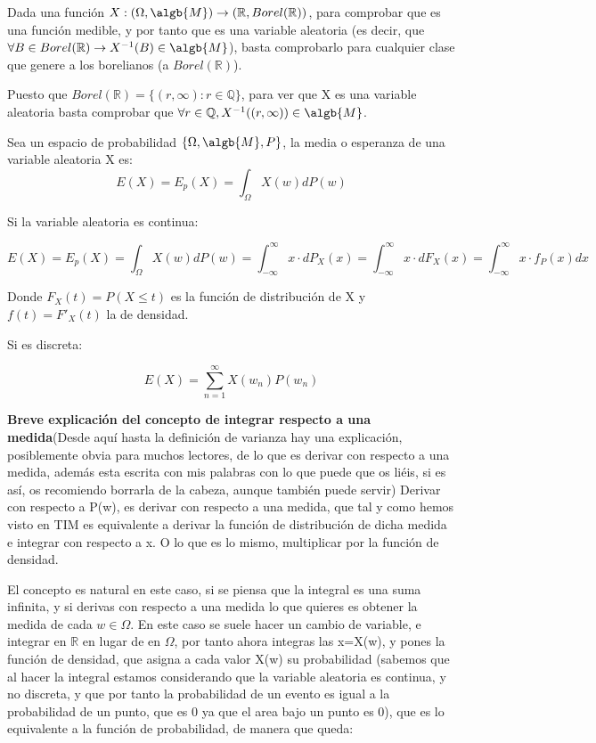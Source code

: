 \documentclass{apuntes}
\begin{document}
\begin{example}
\obs Dada una función $X:(\Omega, \algb{M}) \rightarrow (\mathbb{R}, Borel(\mathbb{R}))$, para comprobar que es una función medible, y por tanto que es una variable aleatoria (es decir, que $\forall B \in Borel(\mathbb{R}) \rightarrow X^{-1}(B) \in \algb{M}$), basta comprobarlo para cualquier clase que genere a los borelianos (a $Borel(\mathbb{R})$).

Puesto que $Borel(\mathbb{R})=\{(r,\infty): r\in \mathbb{Q}\}$, para ver que X es una variable aleatoria basta comprobar que $\forall r \in \mathbb{Q}, X^{-1}((r, \infty)) \in \algb{M}$.

\end{example}

\begin{defn}
Sea un espacio de probabilidad $\{\Omega, \algb{M},P\}$, la media o esperanza de una variable aleatoria X es:
\[
E(X)=E_p(X)=\int_{\Omega}X(w)dP(w)
\]

Si la variable aleatoria es continua:

\[
E(X)=E_p(X)=\int_{\Omega}X(w)dP(w) = \int_{-\infty}^{\infty}x\cdot dP_X(x)= \int_{-\infty}^{\infty}x\cdot dF_X(x) = \int_{-\infty}^{\infty}x\cdot f_P(x) dx
\]

Donde $F_X(t)=P(X \leq t)$ es la función de distribución de X y $f(t)=F'_X(t)$ la de densidad.

Si es discreta:

\[
E(X)=\sum_{n=1}^{\infty}X(w_n)P(w_n)
\]


\obs \textbf{Breve explicación del concepto de integrar respecto a una medida}(Desde aquí hasta la definición de varianza hay una explicación, posiblemente obvia para muchos lectores,  de lo que es derivar con respecto a una medida, además esta escrita con mis palabras con lo que puede que os liéis, si es así, os recomiendo borrarla de la cabeza, aunque también puede servir) Derivar con respecto a P(w), es derivar con respecto a una medida, que tal y como hemos visto en TIM es equivalente a derivar la función de distribución de dicha medida e integrar con respecto a x. O lo que es lo mismo, multiplicar por la función de densidad. 

El concepto es natural en este caso, si se piensa que la integral es una suma infinita, y si derivas con respecto a una medida lo que quieres es obtener la medida de cada $w \in \Omega$. En este caso se suele hacer un cambio de variable, e integrar en $\mathbb{R}$ en lugar de en $\Omega$, por tanto ahora integras las x=X(w), y pones la función de densidad, que asigna a cada valor X(w) su probabilidad (sabemos que al hacer la integral estamos considerando que la variable aleatoria es continua, y no discreta, y que por tanto la probabilidad de un evento es igual a la probabilidad de un punto, que es 0 ya que el area bajo un punto es 0), que es lo equivalente a la función de probabilidad, de manera que queda:


\end{defn}
\end{document}
